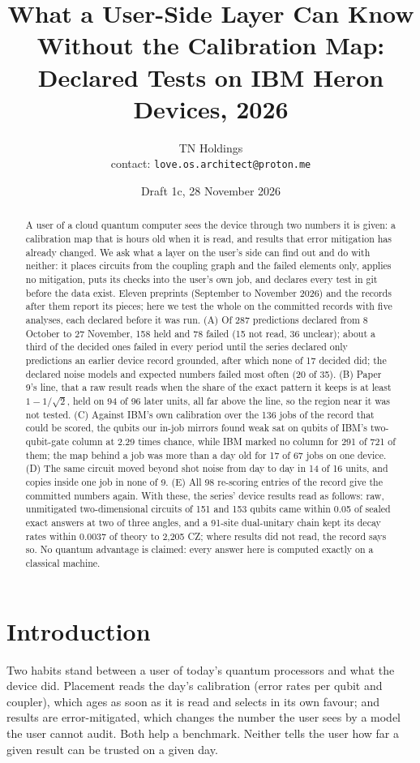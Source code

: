 \documentclass[10pt,a4paper]{article}
\title{What a User-Side Layer Can Know Without the Calibration Map:\\ Declared Tests on IBM Heron Devices, 2026}
\author{TN Holdings\\ \small contact: \texttt{love.os.architect@proton.me}}
\date{Draft 1c, 28 November 2026}
\begin{document}
\maketitle

\begin{abstract}
A user of a cloud quantum computer sees the device through two numbers it is given: a calibration map that is hours
old when it is read, and results that error mitigation has already changed. We ask what a layer on the user's side can
find out and do with neither: it places circuits from the coupling graph and the failed elements only, applies no
mitigation, puts its checks into the user's own job, and declares every test in git before the data exist. Eleven
preprints (September to November 2026) and the records after them report its pieces; here we test the whole on the
committed records with five analyses, each declared before it was run. (A) Of 287 predictions declared from 8 October to
27 November, 158 held and 78 failed (15 not read, 36 unclear); about a third of the decided ones failed in every period
until the series declared only predictions an earlier device record grounded, after which none of 17 decided did; the
declared noise models and expected numbers failed most often (20 of 35). (B) Paper 9's line, that a raw result reads
when the share of the exact pattern it keeps is at least $1-1/\sqrt2$, held on 94 of 96 later units, all far above the
line, so the region near it was not tested. (C) Against IBM's own calibration over the 136 jobs of the record that
could be scored, the qubits our in-job mirrors found weak sat on qubits of IBM's two-qubit-gate column at 2.29 times chance, while IBM marked no
column for 291 of 721 of them; the map behind a job was more than a day old for 17 of 67 jobs on one device. (D) The
same circuit moved beyond shot noise from day to day in 14 of 16 units, and copies inside one job in none of 9. (E) All
98 re-scoring entries of the record give the committed numbers again. With these, the series' device results read as
follows: raw, unmitigated two-dimensional circuits of 151 and 153 qubits came within 0.05 of sealed exact answers at two
of three angles, and a 91-site
dual-unitary chain kept its decay rates within 0.0037 of theory to 2,205 CZ; where results did not read, the record
says so. No quantum advantage is claimed: every answer here is computed exactly on a classical machine.
\end{abstract}

\section{Introduction}\label{sec:intro}
Two habits stand between a user of today's quantum processors and what the device did. Placement reads the day's
calibration (error rates per qubit and coupler), which ages as soon as it is read and selects in its own favour; and
results are error-mitigated, which changes the number the user sees by a model the user cannot audit. Both help a
benchmark. Neither tells the user how far a given result can be trusted on a given day.
\end{document}
